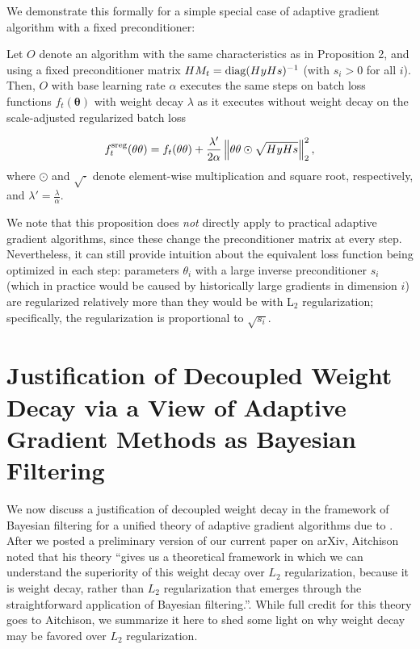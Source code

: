 We demonstrate this formally for a simple special case of adaptive gradient algorithm with a fixed preconditioner:

\begin{prop}[Weight decay = scale-adjusted $L_2$ reg for adaptive gradient algorithm with fixed preconditioner] Let $O$ denote an algorithm with the same characteristics as in Proposition 2, and using a fixed preconditioner matrix $\textbf{M}_t = \text{diag}(\textit{\textbf{s}})^{-1}$ (with $s_i>0$ for all $i$). Then, $O$ with base learning rate $\alpha$ executes the same steps on batch loss functions $f_t(\bm{\theta})$ with weight decay $\lambda$ as it executes without weight decay on the scale-adjusted regularized batch loss 

\begin{equation}f_{t}^{\text{sreg}}(\bm{\theta}) = f_t(\bm{\theta}) + \frac{\lambda'}{2\alpha} \left\lVert\bm{\theta} \odot{} \sqrt{\textit{\textbf{s}}}\right\rVert_2^2,
\end{equation}
where $\odot$ and $\sqrt{\cdot}$ denote element-wise multiplication and square root, respectively, and $\lambda' = \frac{\lambda}{\alpha}$.
\end{prop}

We note that this proposition does \emph{not} directly apply to practical adaptive gradient algorithms, since these change the preconditioner matrix at every step. Nevertheless, it can still provide intuition about the equivalent loss function being optimized in each step: parameters $\theta_i$ with a large inverse preconditioner $s_i$ (which in practice would be caused by historically large gradients in dimension $i$) are regularized relatively more than they would be with L$_2$ regularization; specifically, the regularization is proportional to $\sqrt{s_i}$. 

\section{Justification of Decoupled Weight Decay via a View of Adaptive Gradient Methods as Bayesian Filtering}
\label{sec:justification}

We now discuss a justification of decoupled weight decay in the framework of Bayesian filtering for a unified theory of adaptive gradient algorithms due to \citet{aitchison18}.
After we posted a preliminary version of our current paper on arXiv, Aitchison noted that his theory ``gives us a theoretical framework in which we can understand the superiority of this weight decay over $L_2$ regularization, because it is weight decay, rather than $L_2$ regularization that emerges through the straightforward application of Bayesian filtering.''\citep{aitchison18}. While full credit for this theory goes to Aitchison, we summarize it here to shed some light on why weight decay may be favored over $L_2$ regularization.

